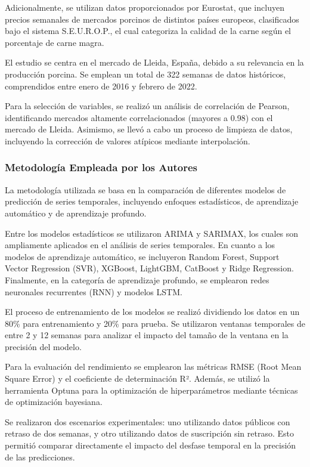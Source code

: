 Adicionalmente, se utilizan datos proporcionados por Eurostat, que incluyen precios semanales de mercados porcinos de distintos países europeos, clasificados bajo el sistema S.E.U.R.O.P., el cual categoriza la calidad de la carne según el porcentaje de carne magra.

El estudio se centra en el mercado de Lleida, España, debido a su relevancia en la producción porcina. Se emplean un total de 322 semanas de datos históricos, comprendidos entre enero de 2016 y febrero de 2022.

Para la selección de variables, se realizó un análisis de correlación de Pearson, identificando mercados altamente correlacionados (mayores a 0.98) con el mercado de Lleida. Asimismo, se llevó a cabo un proceso de limpieza de datos, incluyendo la corrección de valores atípicos mediante interpolación.

\subsubsection{Metodología Empleada por los Autores}

La metodología utilizada se basa en la comparación de diferentes modelos de predicción de series temporales, incluyendo enfoques estadísticos, de aprendizaje automático y de aprendizaje profundo.

Entre los modelos estadísticos se utilizaron ARIMA y SARIMAX, los cuales son ampliamente aplicados en el análisis de series temporales. En cuanto a los modelos de aprendizaje automático, se incluyeron Random Forest, Support Vector Regression (SVR), XGBoost, LightGBM, CatBoost y Ridge Regression. Finalmente, en la categoría de aprendizaje profundo, se emplearon redes neuronales recurrentes (RNN) y modelos LSTM.

El proceso de entrenamiento de los modelos se realizó dividiendo los datos en un 80\% para entrenamiento y 20\% para prueba. Se utilizaron ventanas temporales de entre 2 y 12 semanas para analizar el impacto del tamaño de la ventana en la precisión del modelo.

Para la evaluación del rendimiento se emplearon las métricas RMSE (Root Mean Square Error) y el coeficiente de determinación R². Además, se utilizó la herramienta Optuna para la optimización de hiperparámetros mediante técnicas de optimización bayesiana.

Se realizaron dos escenarios experimentales: uno utilizando datos públicos con retraso de dos semanas, y otro utilizando datos de suscripción sin retraso. Esto permitió comparar directamente el impacto del desfase temporal en la precisión de las predicciones.


